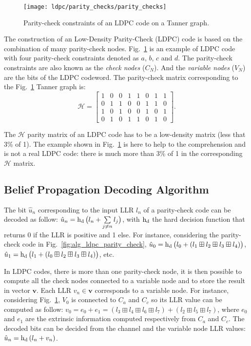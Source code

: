 \begin{figure}[htp]
  \centering
  \texttt{[image: ldpc/parity\_checks/parity\_checks]}
  \caption{Parity-check constraints of an LDPC code on a Tanner graph.}
  \label{fig:ctx_ldpc_parity_checks}
\end{figure}

The construction of an Low-Density Parity-Check (LDPC) code is based on the
combination of many parity-check nodes. Fig.~\ref{fig:ctx_ldpc_parity_checks} is
an example of LDPC code with four parity-check constraints denoted as $a$, $b$,
$c$ and $d$. The parity-check constraints are also known as the \emph{check
nodes} ($C_N$). And the \emph{variable nodes} ($V_N$) are the bits of the LDPC
codeword. The parity-check matrix corresponding to the
Fig.~\ref{fig:ctx_ldpc_parity_checks} Tanner graph is:
\begin{equation*}
\bm{\mathcal{H}} =
\begin{bmatrix}
  1 & 0 & 0 & 1 & 1 & 0 & 1 & 1\\
  0 & 1 & 1 & 0 & 0 & 1 & 1 & 0\\
  1 & 0 & 1 & 0 & 0 & 1 & 0 & 1\\
  0 & 1 & 0 & 1 & 1 & 0 & 1 & 0
\end{bmatrix}.
\end{equation*}

The $\bm{\mathcal{H}}$ parity matrix of an LDPC code has to be a low-density
matrix (less that 3\% of 1). The example shown in
Fig.~\ref{fig:ctx_ldpc_parity_checks} is here to help to the comprehension and
is not a real LDPC code: there is much more than 3\% of 1 in the corresponding
$\bm{\mathcal{H}}$ matrix.

\subsection{Belief Propagation Decoding Algorithm}

The bit $\hat{u}_n$ corresponding to the input LLR $l_n$ of a parity-check code
can be decoded as follow: $\hat{u}_n = \operatorname{h_d}\big(l_n +
\sum\limits_{j \neq n}{l_j}\big)$, with $\operatorname{h_d}$ the hard decision function
that returns 0 if the LLR is positive and 1 else. For instance, considering the
parity-check code in Fig.~\ref{fig:alg_ldpc_parity_check}, $\hat{u}_0 =
\operatorname{h_d}\big(l_0 + (l_1 \boxplus l_2 \boxplus l_3 \boxplus l_4)\big)$,
$\hat{u}_1 = \operatorname{h_d}\big(l_1 + (l_0 \boxplus l_2 \boxplus l_3 \boxplus
l_4)\big)$, etc.

In LDPC codes, there is more than one parity-check node, it is then possible to
compute all the check nodes connected to a variable node and to store the result
in vector $\bm{v}$. Each LLR $v_n \in \bm{v}$ corresponds to a variable node.
For instance, considering Fig.~\ref{fig:ctx_ldpc_parity_checks}, $V_0$ is
connected to $C_a$ and $C_c$ so its LLR value can be computed as follow: $v_0
= e_0 + e_1 = (l_3 \boxplus l_4 \boxplus l_6 \boxplus l_7) + (l_2 \boxplus l_5
\boxplus l_7)$, where $e_0$ and $e_1$ are the extrinsic information computed
respectively from $C_a$ and $C_c$. The decoded bits can be decided from the
channel and the variable node LLR values: $\hat{u}_n = \operatorname{h_d}{(l_n + v_n)}$.

